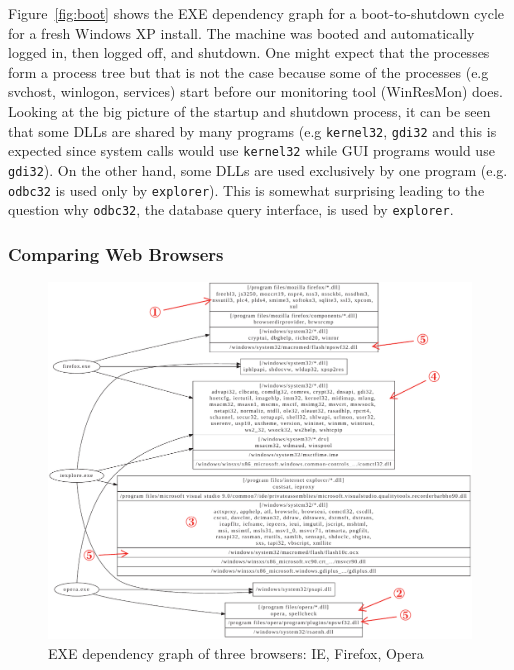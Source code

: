 Figure~\ref{fig:boot} shows the EXE dependency graph for a boot-to-shutdown cycle
for a fresh Windows XP install.
The machine was booted and automatically logged in,
then logged off, and shutdown. One might expect that the processes
form a process tree but that is not the case because some of the processes (e.g
svchost, winlogon, services) start before our monitoring tool
(WinResMon) does. Looking at the big picture of the startup and shutdown
process, it can be seen that some DLLs are shared by many programs (e.g
{\tt kernel32}, {\tt gdi32} and this is expected since system calls would use
{\tt kernel32} while GUI programs would use {\tt gdi32}).
On the other hand, some DLLs are used exclusively by one program (e.g.
{\tt odbc32} is used only by {\tt explorer}).
This is somewhat surprising leading to the question why {\tt odbc32},
the database query interface, is used by {\tt explorer}.

\subsubsection{Comparing Web Browsers}

\begin{figure}[bthp]
\centering
\includegraphics[width=1.0\textwidth]{depvis/browsers-group-annot.pdf}
\caption{EXE dependency graph of three browsers: IE, Firefox, Opera}
\label{fig:browsers}
\end{figure}

